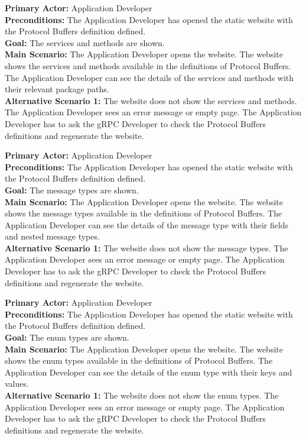 
\textbf{Primary Actor:} Application Developer\\
\textbf{Preconditions:} The Application Developer has opened the static website with the Protocol Buffers definition defined.\\
\textbf{Goal:} The services and methods are shown.\\
\textbf{Main Scenario:}
The Application Developer opens the website.
The website shows the services and methods available in the definitions of Protocol Buffers.
The Application Developer can see the details of the services and methods with their relevant package paths.\\
\textbf{Alternative Scenario 1:}
The website does not show the services and methods.
The Application Developer sees an error message or empty page.
The Application Developer has to ask the gRPC Developer to check the Protocol Buffers definitions and regenerate the website.


\textbf{Primary Actor:} Application Developer\\
\textbf{Preconditions:} The Application Developer has opened the static website with the Protocol Buffers definition defined.\\
\textbf{Goal:} The message types are shown.\\
\textbf{Main Scenario:}
The Application Developer opens the website.
The website shows the message types available in the definitions of Protocol Buffers.
The Application Developer can see the details of the message type with their fields and nested message types.\\
\textbf{Alternative Scenario 1:}
The website does not show the message types.
The Application Developer sees an error message or empty page.
The Application Developer has to ask the gRPC Developer to check the Protocol Buffers definitions and regenerate the website.


\textbf{Primary Actor:} Application Developer\\
\textbf{Preconditions:} The Application Developer has opened the static website with the Protocol Buffers definition defined.\\
\textbf{Goal:} The enum types are shown.\\
\textbf{Main Scenario:}
The Application Developer opens the website.
The website shows the enum types available in the definitions of Protocol Buffers.
The Application Developer can see the details of the enum type with their keys and values.\\
\textbf{Alternative Scenario 1:}
The website does not show the enum types.
The Application Developer sees an error message or empty page.
The Application Developer has to ask the gRPC Developer to check the Protocol Buffers definitions and regenerate the website.

